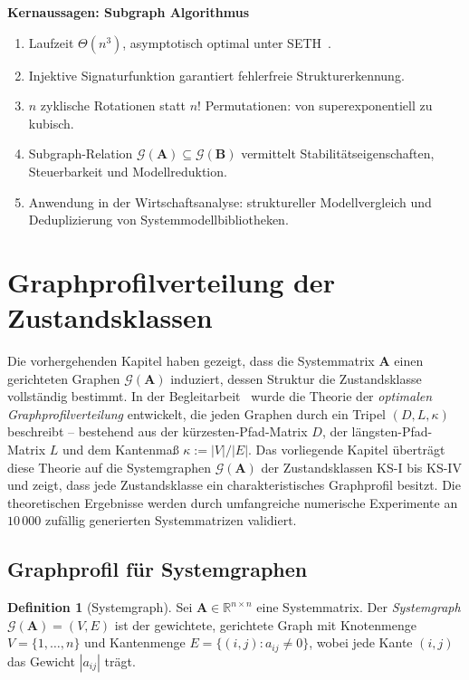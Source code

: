 \documentclass[a4paper, 12pt, twoside, openright]{report}
\theoremstyle{definition}
\newtheorem{definition}[theorem]{Definition}
\theoremstyle{definition}
\newcommand{\R}{\mathbb{R}}
\newcommand{\vA}{\bm{A}}
\newcommand{\vB}{\bm{B}}
\begin{document}
\textbf{Kernaussagen: Subgraph Algorithmus}
\begin{enumerate}[label=(\roman*)]
  \item Laufzeit $\Theta(n^3)$, asymptotisch optimal unter SETH~\citep{epp2026subgraph}.
  \item Injektive Signaturfunktion garantiert fehlerfreie Strukturerkennung.
  \item $n$ zyklische Rotationen statt $n!$ Permutationen: von superexponentiell zu kubisch.
  \item Subgraph-Relation $\mathcal{G}(\vA) \subseteq \mathcal{G}(\vB)$ vermittelt
    Stabilitätseigenschaften, Steuerbarkeit und Modellreduktion.
  \item Anwendung in der Wirtschaftsanalyse: struktureller Modellvergleich und
    Deduplizierung von Systemmodellbibliotheken.
\end{enumerate}

\section{Graphprofilverteilung der Zustandsklassen}
\label{sec:graphprofil}

Die vorhergehenden Kapitel haben gezeigt, dass die Systemmatrix $\vA$ einen
gerichteten Graphen $\mathcal{G}(\vA)$ induziert, dessen Struktur die Zustandsklasse
vollständig bestimmt. In der Begleitarbeit~\citep{epp2026graphs} wurde die Theorie der
\emph{optimalen Graphprofilverteilung} entwickelt, die jeden Graphen durch ein
Tripel $(D, L, \kappa)$ beschreibt -- bestehend aus der kürzesten-Pfad-Matrix $D$,
der längsten-Pfad-Matrix $L$ und dem Kantenmaß $\kappa := |V|/|E|$.
Das vorliegende Kapitel überträgt diese Theorie auf die Systemgraphen
$\mathcal{G}(\vA)$ der Zustandsklassen KS-I bis KS-IV und zeigt, dass jede
Zustandsklasse ein charakteristisches Graphprofil besitzt. Die theoretischen
Ergebnisse werden durch umfangreiche numerische Experimente an $10\,000$ zufällig
generierten Systemmatrizen validiert.

\subsection{Graphprofil für Systemgraphen}

\begin{definition}[Systemgraph]
\label{def:systemgraph_gpv}
Sei $\vA \in \R^{n \times n}$ eine Systemmatrix. Der \emph{Systemgraph}
$\mathcal{G}(\vA) = (V, E)$ ist der gewichtete, gerichtete Graph mit
Knotenmenge $V = \{1, \ldots, n\}$ und Kantenmenge
$E = \{(i,j) : a_{ij} \neq 0\}$,
wobei jede Kante $(i,j)$ das Gewicht $|a_{ij}|$ trägt.
\end{definition}
\end{document}
